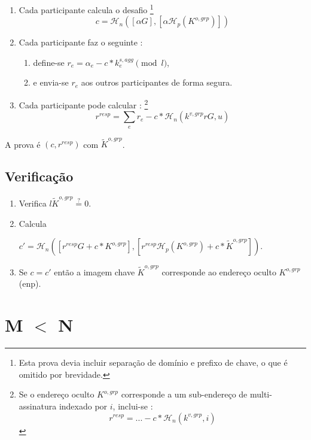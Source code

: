 \begin{enumerate}
    \item Cada participante calcula o desafio 
\footnote{Esta prova devia incluir separação de domínio e prefixo de chave, o que é omitido por brevidade.}
    \vspace{.175cm}
    \[c = \mathcal{H}_n([\alpha G],[\alpha \mathcal{H}_p(K^{o,grp})])\]
    \item Cada participante faz o seguinte : 
    \begin{enumerate}
        \item define-se $r_e = \alpha_e - c*k^{s,agg}_e \pmod l$,
        \item e envia-se $r_e$ aos outros participantes de forma segura.
    \end{enumerate}
    \item Cada participante pode calcular :
\footnote{Se o endereço oculto $K^{o,grp}$ corresponde a um sub-endereço de multi-assinatura indexado por $i$, inclui-se :
\[r^{resp} = ... - c*\mathcal{H}_n(k^{v,grp},i)\]}
\vspace{.175cm}
    \[r^{resp} = \sum_e r_e - c*\mathcal{H}_n(k^{v,grp} r G, u)\]
\end{enumerate}

A prova é $(c,r^{resp})$ com $\tilde{K}^{o,grp}$.
\subsection*{Verificação}

\begin{enumerate}
    \item Verifica $l \tilde{K}^{o,grp} \stackrel{?}{=} 0$.
    \item Calcula 

$c' = \mathcal{H}_n([r^{resp} G + c*K^{o,grp}],[r^{resp} \mathcal{H}_p(K^{o,grp}) + c*\tilde{K}^{o,grp}])$.
    \item Se $c = c'$ então a imagem chave $\tilde{K}^{o,grp}$ corresponde ao endereço oculto $K^{o,grp}$ (enp).
\end{enumerate}


    
\section{M $<$ N}
\label{sec:smaller-thresholds}

